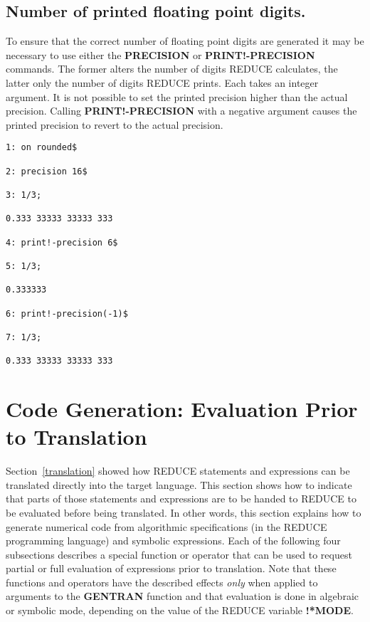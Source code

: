 \subsection{Number of printed floating point digits.}
To ensure that the correct number of floating point digits are generated it may
be necessary to use either the {\bf PRECISION} or {\bf PRINT!-PRECISION}
commands.  The former alters the number of digits REDUCE calculates, the latter
only the number of digits REDUCE prints.  Each takes an integer argument.
It is not possible to set the printed precision higher than the actual 
precision.  Calling {\bf PRINT!-PRECISION} with a negative argument causes the
printed precision to revert to the actual precision.
\begin{verbatim}
1: on rounded$

2: precision 16$

3: 1/3;

0.333 33333 33333 333

4: print!-precision 6$

5: 1/3;

0.333333

6: print!-precision(-1)$

7: 1/3;

0.333 33333 33333 333
\end{verbatim}

\section{Code Generation:  Evaluation Prior to Translation}
\label{generation}
Section~\ref{translation} showed how REDUCE statements and expressions can be
translated directly into the target language.  This section shows how to
indicate that parts of those statements and expressions are to be
handed to REDUCE to be evaluated before being translated.  In
other words, this section explains how to generate numerical
code from algorithmic specifications (in the REDUCE programming
language) and symbolic expressions.  Each of the following four
subsections describes a special function or operator that
can be used to request partial or full evaluation of expressions
prior to translation.  Note that these functions and operators have
the described effects {\it only} when applied to arguments to the 
{\bf GENTRAN} function and that evaluation is done
in algebraic or symbolic mode, depending on the value of the REDUCE
variable {\bf !*MODE}.
